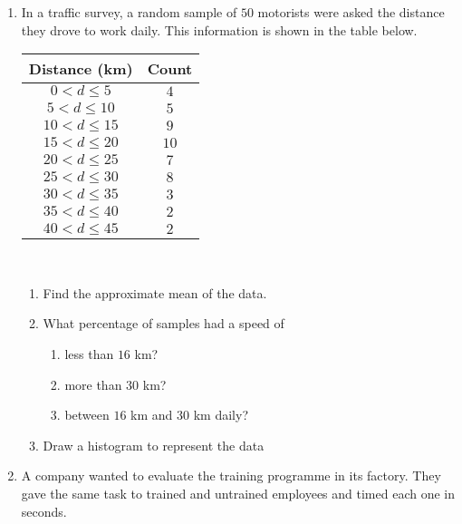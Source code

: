 \begin{eocexercises}{}
\begin{enumerate}[itemsep=6pt, label=\textbf{\arabic*}.]
  \item In a traffic survey, a random sample of $50$ motorists were
    asked the distance they drove to work daily. This information is
    shown in the table below.\\
    \begin{center}
      \begin{tabular}{|c|c|} \hline
     
        \textbf{Distance (km)} & \textbf{Count} \\ \hline

        $0 < d \le 5$ & $4$ \\ \hline
        $5 < d \le 10$ & $5$ \\\hline
        $10 < d \le 15$ & $9$ \\\hline
        $15 < d \le 20$ & $10$ \\\hline
        $20 < d \le 25$ & $7$ \\\hline
        $25 < d \le 30$ & $8$ \\\hline
        $30 < d \le 35$ & $3$ \\\hline
        $35 < d \le 40$ & $2$ \\\hline
        $40 < d \le 45$ & $2$ \\\hline

      \end{tabular}
    \end{center}
\vspace {8pt}\\
     \begin{enumerate}[noitemsep, label=\textbf{(\alph*)} ]
    \item Find the approximate mean of the data.
    \item What percentage of samples had a speed of
      \begin{enumerate}[noitemsep, label=\textbf{\roman*}. ]
      \item less than $16$ km?
      \item more than $30$ km?
      \item between $16$ km and $30$ km daily?
      \end{enumerate}
\item Draw a histogram to represent the data
    \end{enumerate}

  \item A company wanted to evaluate the training programme in its
    factory. They gave the same task to trained and untrained
    employees and timed each one in seconds.
\\
    \begin{center}
      \begin{tabular}{|l|c|c|c|c|c|} \hline


\end{tabular}
\end{center}
\end{enumerate}
\end{eocexercises}
